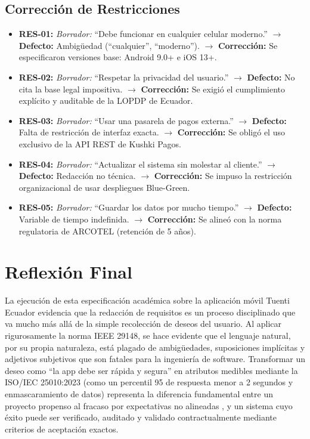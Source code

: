 \documentclass[12pt,a4paper]{article}
\begin{document}
\subsection{Corrección de Restricciones}
\begin{itemize}
    \item \textbf{RES-01:} \textit{Borrador:} ``Debe funcionar en cualquier celular moderno.'' $\rightarrow$ \textbf{Defecto:} Ambigüedad (``cualquier'', ``moderno''). $\rightarrow$ \textbf{Corrección:} Se especificaron versiones base: Android 9.0+ e iOS 13+.
    \item \textbf{RES-02:} \textit{Borrador:} ``Respetar la privacidad del usuario.'' $\rightarrow$ \textbf{Defecto:} No cita la base legal impositiva. $\rightarrow$ \textbf{Corrección:} Se exigió el cumplimiento explícito y auditable de la LOPDP de Ecuador.
    \item \textbf{RES-03:} \textit{Borrador:} ``Usar una pasarela de pagos externa.'' $\rightarrow$ \textbf{Defecto:} Falta de restricción de interfaz exacta. $\rightarrow$ \textbf{Corrección:} Se obligó el uso exclusivo de la API REST de Kushki Pagos.
    \item \textbf{RES-04:} \textit{Borrador:} ``Actualizar el sistema sin molestar al cliente.'' $\rightarrow$ \textbf{Defecto:} Redacción no técnica. $\rightarrow$ \textbf{Corrección:} Se impuso la restricción organizacional de usar despliegues Blue-Green.
    \item \textbf{RES-05:} \textit{Borrador:} ``Guardar los datos por mucho tiempo.'' $\rightarrow$ \textbf{Defecto:} Variable de tiempo indefinida. $\rightarrow$ \textbf{Corrección:} Se alineó con la norma regulatoria de ARCOTEL (retención de 5 años).
\end{itemize}

\section{Reflexión Final}
La ejecución de esta especificación académica sobre la aplicación móvil Tuenti Ecuador evidencia que la redacción de requisitos es un proceso disciplinado que va mucho más allá de la simple recolección de deseos del usuario. Al aplicar rigurosamente la norma IEEE 29148, se hace evidente que el lenguaje natural, por su propia naturaleza, está plagado de ambigüedades, suposiciones implícitas y adjetivos subjetivos que son fatales para la ingeniería de software. Transformar un deseo como ``la app debe ser rápida y segura'' en atributos medibles mediante la ISO/IEC 25010:2023 (como un percentil 95 de respuesta menor a 2 segundos y enmascaramiento de datos) representa la diferencia fundamental entre un proyecto propenso al fracaso por expectativas no alineadas \cite{pohl2025}, y un sistema cuyo éxito puede ser verificado, auditado y validado contractualmente mediante criterios de aceptación exactos.
\end{document}
